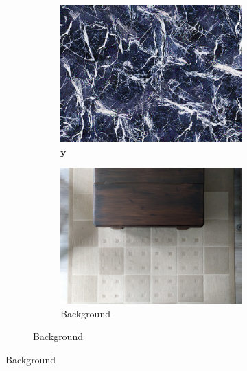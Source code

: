 \begin{figure}[]
    \centering    
    \begin{subfigure}{\textwidth}
        \centering
        \begin{subfigure}{0.24\textwidth}
            \centering
            \includegraphics[width=\textwidth]{images/04-experiment02/carpet/marble/target.jpg}
            \caption*{\(\bm{y}\)}
        \end{subfigure}
        \hfill
        \begin{subfigure}{0.24\textwidth}
            \centering
            \includegraphics[width=\textwidth]{images/04-experiment02/carpet/bg.jpg}
            \caption*{Background}

\end{subfigure}
\end{subfigure}
\end{figure}
